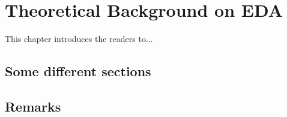 \chapter{Theoretical Background on EDA}
\label{chap:TheoreticalBackgroundEDA}

\pagestyle{plain}

\vspace{0.5cm}

\noindent This chapter introduces the readers to...

\section{Some different sections}

\section{Remarks}
